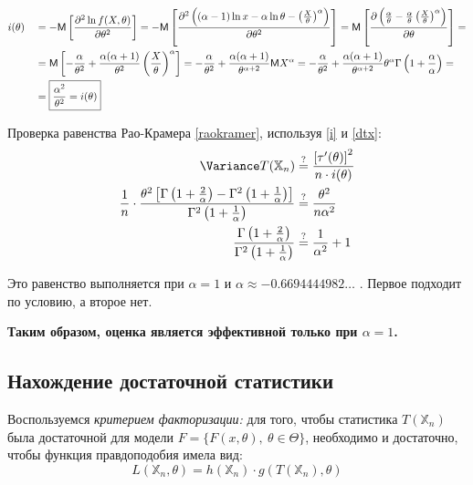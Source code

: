 \documentclass[12pt]{article}
\newcommand{\MExpect}{\mathsf{M}}
\begin{document}
\begin{align}
&i(\theta) &&= - \MExpect \left[\frac{\partial^2 \ln f(X, \theta)}{\partial \theta^2}\right] = - \MExpect \left[\frac{\partial^2\left((\alpha-1)\ln x - \alpha\ln\theta -\left(\frac{X}{\theta}\right)^\alpha\right)}{\partial \theta^2}\right] = \MExpect \left[\frac{\partial\left(\frac{\alpha}{\theta} - \frac{\alpha}{\theta}\left(\frac{X}{\theta}\right)^\alpha\right)}{\partial \theta}\right] = \notag\\
&&&= \MExpect \left[-\frac{\alpha}{\theta^2} + \frac{\alpha(\alpha+1)}{\theta^2}\left(\frac{X}{\theta}\right)^\alpha\right] = -\frac{\alpha}{\theta^2} + \frac{\alpha(\alpha+1)}{\theta^{\alpha+2}}\MExpect X^\alpha = -\frac{\alpha}{\theta^2} + \frac{\alpha(\alpha+1)}{\theta^{\alpha+2}} \theta^\alpha\Gamma \left(1+\frac{\alpha}{\alpha} \right) =\notag\\
&&&= \boxed{\frac{\alpha^2}{\theta^2} = i(\theta)}\label{i}
\end{align}

Проверка равенства Рао-Крамера \eqref{raokramer}, используя \eqref{i} и \eqref{dtx}:
$$
\begin{aligned}
\Variance T(\mathbb{X}_n) &\stackrel{?}{=} \frac{\left[\tau'(\theta)\right]^2}{n\cdot i(\theta)} \\
\frac{1}{n}\cdot \frac{\theta^2\left[\Gamma \left(1+\frac{2}{\alpha} \right) - \Gamma^2 \left(1+\frac{1}{\alpha} \right)\right]}{\Gamma^2 \left(1+\frac{1}{\alpha} \right)} &\stackrel{?}{=} \frac{\theta^2}{n\alpha^2} \\
\frac{\Gamma \left(1+\frac{2}{\alpha} \right)}{\Gamma^2 \left(1+\frac{1}{\alpha} \right)} &\stackrel{?}{=} \frac{1}{\alpha^2}+1
\end{aligned}
$$

Это равенство выполняется при $\alpha=1$ и $\alpha \approx -0.6694444982\dotso$ . Первое подходит по условию, а второе нет.

\begin{center}
\textbf{Таким образом, оценка является эффективной только при $\alpha=1$.}
\end{center}

\subsection{Нахождение достаточной статистики}

Воспользуемся \textit{критерием факторизации:} для того, чтобы статистика $T(\mathbb{X}_n)$ была достаточной для модели $F=\{F(x, \theta),\ \theta\in\Theta\}$, необходимо и достаточно, чтобы функция правдоподобия имела вид:
\begin{equation}\label{dostat}
	L(\mathbb{X}_n, \theta) = h(\mathbb{X}_n)\cdot g(T(\mathbb{X}_n), \theta)
\end{equation}
\end{document}
